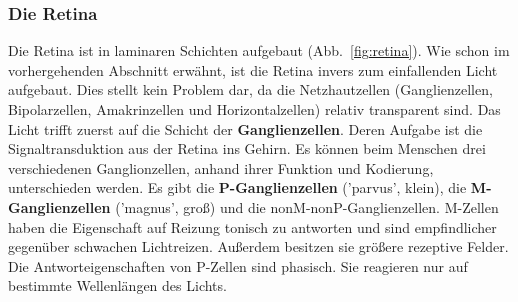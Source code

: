 \documentclass[12pt,a4paper,pdftex]{article}
\begin{document}
\subsubsection*{Die Retina}


Die Retina ist in laminaren Schichten aufgebaut (Abb.~\ref{fig:retina}).
Wie schon im vorhergehenden Abschnitt erwähnt, ist die Retina invers zum einfallenden Licht aufgebaut. Dies stellt kein Problem dar, da die Netzhautzellen (Ganglienzellen, Bipolarzellen, Amakrinzellen und Horizontalzellen) relativ transparent sind. Das Licht trifft zuerst auf die Schicht der \textbf{Ganglienzellen}.  Deren Aufgabe ist die Signaltransduktion aus der Retina ins Gehirn. Es können beim Menschen drei verschiedenen Ganglionzellen, anhand ihrer Funktion und Kodierung, unterschieden werden. Es gibt die \textbf{P-Ganglienzellen}  ('parvus', klein), die \textbf{M-Ganglienzellen}  ('magnus', groß) und die nonM-nonP-Ganglienzellen. 
M-Zellen haben die Eigenschaft auf Reizung tonisch zu antworten und sind empfindlicher gegenüber schwachen Lichtreizen. Außerdem besitzen sie größere rezeptive Felder. Die Antworteigenschaften von P-Zellen sind phasisch. Sie reagieren nur auf bestimmte Wellenlängen des Lichts. 
\end{document}
